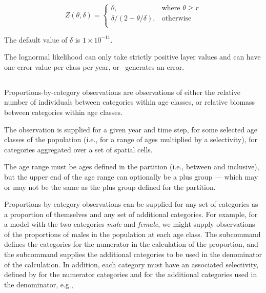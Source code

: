 \begin{equation}
   Z \left(\theta,\delta \right) = \begin{cases}
	  \theta, & \text{where $\theta \ge r$} \\
	  \delta/\left( 2-\theta/\delta \right), & \text{otherwise} \\  
  \end{cases}
\end{equation}

The default value of $\delta$ is $1 \times 10^{-11}$.

\TODO

The lognormal likelihood can only take strictly positive layer values and can have one error value per class per year, or \SPM\ generates an error.

\TODOend

\subsection{\label{sec:proportions-by-category}}
Proportions-by-category observations are observations of either the relative number of individuals between categories within age classes, or relative biomass between categories within age classes. 

The observation is supplied for a given year and time step, for some selected age classes of the population (i.e., for a range of ages multiplied by a selectivity), for categories aggregated over a set of spatial cells. 

The age range must be ages defined in the partition (i.e., between  and  inclusive), but the upper end of the age range can optionally be a plus group --- which may or may not be the same as the plus group defined for the partition. 

Proportions-by-category observations can be supplied for any set of categories as a proportion of themselves and any set of additional categories. For example, for a model with the two categories \emph{male} and \emph{female}, we might supply observations of the proportions of males in the population at each age class. The subcommand  defines the categories for the numerator in the calculation of the proportion, and the subcommand  supplies the additional categories to be used in the denominator of the calculation. In addition, each category must have an associated selectivity, defined by  for the numerator categories and  for the additional categories used in the denominator, e.g., 

